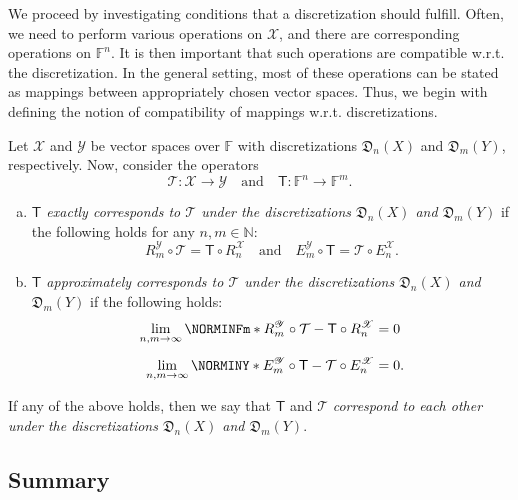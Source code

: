 \documentclass[a4paper]{paper}
\makeatletter
\newcommand*{\SPC}[1]{{\ensuremath{\mathscr{#1}}}}
\newcommand*{\SPCX}{\SPC{X}}
\newcommand*{\SPCY}{\SPC{Y}}
\newcommand{\FIELD}{{\ensuremath{\mathbb{F}}}}
\newcommand*{\Fn}{{\ensuremath{\FIELD^n}}}
\newcommand*{\Fm}{{\ensuremath{\FIELD^m}}}
\newcommand{\Natural}{\mathbb{N}}
\newcommand*{\OP}[1]{{\ensuremath{\mathcal{#1}}}}
\newcommand*{\OPT}{\OP{T}}
\newcommand{\DISCOP}[1]{{\ensuremath{\mathsf{#1}}}}
\newcommand*{\DISCOPT}{\DISCOP{T}}
\newcommand*{\EXT}[2]{\ensuremath{E_{#1}^{#2}}}
\newcommand*{\REST}[2]{\ensuremath{R_{#1}^{#2}}}
\newcommand*{\RnX}{{\ensuremath{\REST{n}{\SPC{X}}}}}
\newcommand*{\RmY}{{\ensuremath{\REST{m}{\SPC{Y}}}}}
\newcommand*{\EnX}{{\ensuremath{\EXT{n}{\SPC{X}}}}}
\newcommand*{\EmY}{{\ensuremath{\EXT{m}{\SPC{Y}}}}}
\newcommand*{\DISCR}[2]{{\ensuremath{\mathfrak{D}_{#2}(#1)}}}
\newcommand*{\DISCRnX}{\DISCR{X}{n}}
\newcommand*{\DISCRmY}{\DISCR{Y}{m}}
\newcommand{\wrt}{{w.r.t.}\@\xspace}
\makeatother
\begin{document}
We proceed by investigating conditions that a discretization should fulfill. Often, we need to perform various 
operations on $\SPCX$, and there are corresponding operations on $\Fn$. It is then important that such 
operations are compatible \wrt the discretization. In the general setting, most of these operations can be stated as 
mappings between appropriately chosen vector spaces. Thus, we begin with defining the notion of compatibility of 
mappings \wrt discretizations. 
%
\begin{definition}
 \label{def:discr:corresp:operator_compat}
 Let $\SPCX$ and $\SPCY$ be vector spaces over $\FIELD$ with discretizations $\DISCRnX$ and 
 $\DISCRmY$, respectively. Now, consider the operators
 \begin{equation*}
  \OPT \colon \SPCX \to \SPCY \quad\text{and}\quad \DISCOPT \colon \Fn \to \Fm.
 \end{equation*}
 \vspace{-2\baselineskip}
 \begin{enumerate}[(a)]
  \item \label{def:discr:corresp:operator_compat:a_exact}
  \emph{$\DISCOPT$ exactly corresponds to $\OPT$ under the discretizations $\DISCRnX$ and  
  $\DISCRmY$} if the following holds for any $n,m \in \Natural$:
  \begin{equation*}
   \RmY \circ \OPT = \DISCOPT \circ \RnX  \quad\text{and}\quad  \EmY \circ \DISCOPT = \OPT \circ \EnX.
  \end{equation*}

  \item \label{def:discr:corresp:operator_compat:b_approx}
  \emph{$\DISCOPT$ approximately corresponds to $\OPT$ under the discretizations $\DISCRnX$ and 
  $\DISCRmY$} if the following holds:
  \begin{align*} 
   \lim_{n,m\to \infty} \NORMINFm*{\RmY \circ \OPT - \DISCOPT \circ \RnX} &= 0  \\[0.5em]
   \lim_{n,m\to \infty} \NORMINY*{\EmY \circ \DISCOPT - \OPT \circ \EnX} &= 0.
  \end{align*}
 \end{enumerate}  
 If any of the above holds, then we say that $\DISCOPT$ and $\OPT$ \emph{correspond to each other under the 
 discretizations $\DISCRnX$ and $\DISCRmY$}.
\end{definition}



\subsection{Summary}
\label{subsec:discr:summary}
\end{document}
